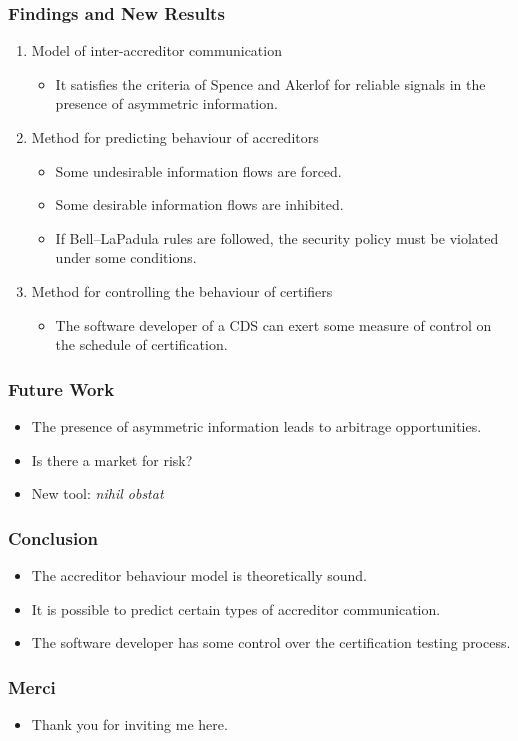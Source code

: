 \documentclass{beamer}
\begin{document}
\begin{frame}
	\frametitle{Findings and New Results}
	\begin{enumerate}
		\item Model of inter-accreditor communication
			\begin{itemize}
				\item It satisfies the criteria of Spence and Akerlof for reliable signals
					in the presence of asymmetric information.
			\end{itemize}
		\item Method for predicting behaviour of accreditors
			\begin{itemize}
				\item Some undesirable information flows are forced.
				\item Some desirable information flows are inhibited.
				\item If Bell--LaPadula rules are followed, the security policy must be
					violated under some conditions.
			\end{itemize}
		\item Method for controlling the behaviour of certifiers
			\begin{itemize}
				\item The software developer of a CDS can exert some measure of control
					on the schedule of certification.
			\end{itemize}
	\end{enumerate}
\end{frame}

\begin{frame}
	\frametitle{Future Work}
	\begin{itemize}
		\item The presence of asymmetric information leads to arbitrage opportunities.
		\item Is there a market for risk?
		\item New tool: \emph{nihil obstat}
	\end{itemize}
\end{frame}

\begin{frame}
	\frametitle{Conclusion}
	\begin{itemize}
		\item The accreditor behaviour model is theoretically sound.
		\item It is possible to predict certain types of accreditor communication.
		\item The software developer has some control over the certification testing process.
	\end{itemize}
\end{frame}

\begin{frame}
	\frametitle{Merci}
	\begin{itemize}
		\item Thank you for inviting me here.
	\end{itemize}
\end{frame}
\end{document}
